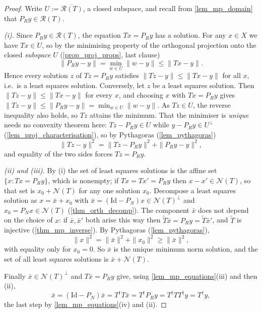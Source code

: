 \documentclass[a4paper]{report}
\theoremstyle{plain}
\theoremstyle{definition}
\theoremstyle{remark}
\newcommand{\Ran}{\mathcal{R}}
\newcommand{\Ker}{\mathcal{N}}
\newcommand{\Id}{\mathrm{Id}}
\newcommand{\dg}{^{\dagger}}
\begin{document}
\begin{proof}
  Write $U := \overline{\Ran(T)}$, a closed subspace, and recall from
  \cref{lem_mp_domain} that $P_Ry \in \Ran(T)$.

  \emph{(i).}  Since $P_Ry \in \Ran(T)$, the equation $Tx = P_Ry$ has a solution.  For any
  $x \in X$ we have $Tx \in U$, so by the minimising property of the orthogonal projection
  onto the closed \emph{subspace} $U$ (\cref{prop_proj_props}, last clause)
  \[
    \|P_Ry - y\| = \min_{w \in U}\|w - y\| \le \|Tx - y\| .
  \]
  Hence every solution $z$ of $Tz = P_Ry$ satisfies $\|Tz - y\| \le \|Tx - y\|$ for all
  $x$, i.e.\ is a least squares solution.  Conversely, let $z$ be a least squares solution.
  Then $\|Tz - y\| \le \|Tx - y\|$ for every $x$, and choosing $x$ with $Tx = P_Ry$ gives
  $\|Tz - y\| \le \|P_Ry - y\| = \min_{w \in U}\|w - y\|$.  As $Tz \in U$, the reverse
  inequality also holds, so $Tz$ attains the minimum.  That the minimiser is \emph{unique}
  needs no convexity theorem here: $Tz - P_Ry \in U$ while $y - P_Ry \in U^{\perp}$
  (\cref{lem_proj_characterisation}), so by Pythagoras (\cref{lem_pythagoras})
  \[
    \|Tz - y\|^2 = \|Tz - P_Ry\|^2 + \|P_Ry - y\|^2 ,
  \]
  and equality of the two sides forces $Tz = P_Ry$.



  \emph{(ii) and (iii).}  By (i) the set of least squares solutions is the affine set
  $\{x : Tx = P_Ry\}$, which is nonempty; if $Tx = Tx' = P_Ry$ then $x - x' \in \Ker(T)$,
  so that set is $x_0 + \Ker(T)$ for any one solution $x_0$.  Decompose a least squares
  solution as $x = \bar{x} + x_0$ with $\bar{x} = (\Id - P_N)x \in \Ker(T)^{\perp}$ and
  $x_0 = P_Nx \in \Ker(T)$ (\cref{thm_orth_decomp}).  The component $\bar{x}$ does not depend
  on the choice of $x$: if $\bar{x}, \bar{x}'$ both arise this way then
  $\tilde{T}\bar{x} = P_Ry = \tilde{T}\bar{x}'$, and $\tilde{T}$ is injective
  (\cref{thm_mp_inverse}).  By Pythagoras (\cref{lem_pythagoras}),
  \[
    \|x\|^2 = \|\bar{x}\|^2 + \|x_0\|^2 \ge \|\bar{x}\|^2 ,
  \]
  with equality only for $x_0 = 0$.  So $\bar{x}$ is the unique minimum norm solution, and
  the set of all least squares solutions is $\bar{x} + \Ker(T)$.

  Finally $\bar{x} \in \Ker(T)^{\perp}$ and $T\bar{x} = P_Ry$ give, using
  \cref{lem_mp_equations}(iii) and then (ii),
  \[
    \bar{x} = (\Id - P_N)\bar{x} = T\dg T\bar{x} = T\dg P_Ry = T\dg TT\dg y = T\dg y,
  \]
  the last step by \cref{lem_mp_equations}(iv) and (ii).
\end{proof}
\end{document}
